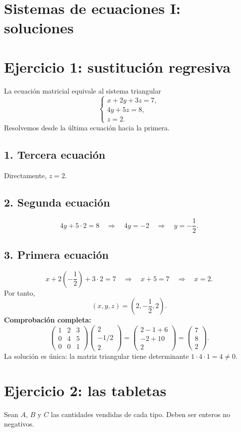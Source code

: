 \documentclass[11pt]{article}
\begin{document}
\section*{Sistemas de ecuaciones I: soluciones}
\section*{Ejercicio 1: sustitución regresiva}
La ecuación matricial equivale al sistema triangular
\[
\begin{cases}x+2y+3z=7,\\4y+5z=8,\\z=2.\end{cases}
\]
Resolvemos desde la última ecuación hacia la primera.
\subsection*{1. Tercera ecuación}
Directamente, $z=2$.
\subsection*{2. Segunda ecuación}
\[4y+5\cdot2=8\quad\Longrightarrow\quad4y=-2\quad\Longrightarrow\quad y=-\frac12.\]
\subsection*{3. Primera ecuación}
\[x+2\left(-\frac12\right)+3\cdot2=7\quad\Longrightarrow\quad x+5=7\quad\Longrightarrow\quad x=2.\]
Por tanto,
\[\boxed{(x,y,z)=\left(2,-\frac12,2\right)}.\]
\textbf{Comprobación completa:}
\[
\begin{pmatrix}1&2&3\\0&4&5\\0&0&1\end{pmatrix}
\begin{pmatrix}2\\-1/2\\2\end{pmatrix}
=\begin{pmatrix}2-1+6\\-2+10\\2\end{pmatrix}
=\begin{pmatrix}7\\8\\2\end{pmatrix}.
\]
La solución es única: la matriz triangular tiene determinante $1\cdot4\cdot1=4\neq0$.
\clearpage
\section*{Ejercicio 2: las tabletas}
Sean $A$, $B$ y $C$ las cantidades vendidas de cada tipo. Deben ser enteros no negativos.
\end{document}
